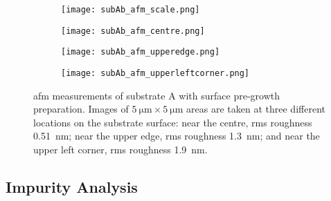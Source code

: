 \begin{figure}[htbp]
    \centering
    \begin{subfigure}[t]{0.032\linewidth}
    \centering
        \texttt{[image: subAb\_afm\_scale.png]}
        \captionsetup{list=no}
    \end{subfigure}
    \hfill
    \begin{subfigure}[t]{0.3\linewidth}
        \centering
        \texttt{[image: subAb\_afm\_centre.png]}
        \caption{}\label{fig:subAb_afm_centre} %
    \end{subfigure}%
    \hfill
    \begin{subfigure}[t]{0.3\linewidth}
        \centering
        \texttt{[image: subAb\_afm\_upperedge.png]}
        \caption{}\label{fig:subAb_afm_edge} %
    \end{subfigure}%
    \hfill
    \begin{subfigure}[t]{0.3\linewidth}
        \centering
        \texttt{[image: subAb\_afm\_upperleftcorner.png]}
        \caption{}\label{fig:subAb_afm_corner}%
    \end{subfigure}%
    \caption[\Ac{afm} of substrate A with surface pre-growth preparation.]{\Acf{afm} measurements of substrate A with surface pre-growth preparation. Images of $\SI{5}{\micro\metre}\times\SI{5}{\micro\metre}$ areas are taken at three different locations on the substrate surface:  near the centre, \ac{rms} roughness \SI{0.51}{\nano\metre};  near the upper edge, \ac{rms} roughness \SI{1.3}{\nano\metre}; and  near the upper left corner, \ac{rms} roughness \SI{1.9}{\nano\metre}.}\label{fig:subAb_afm}
\end{figure} %

\subsection{Impurity Analysis}


